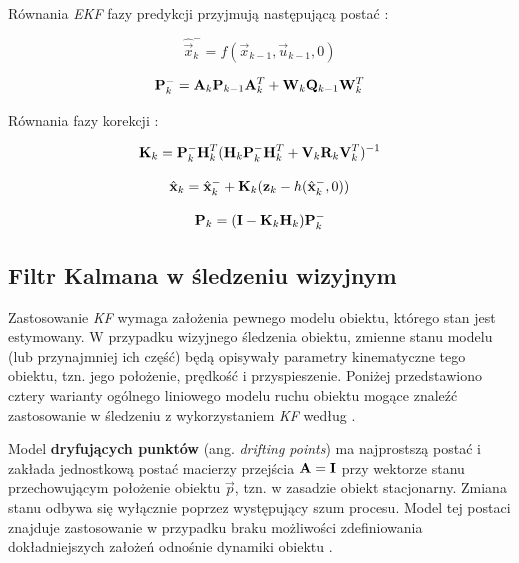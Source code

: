 Równania \textit{EKF} fazy predykcji przyjmują następującą postać \cite{Welch1995}:

\begin{equation}
\label{equ:Rozszerzony_Filtr_Kalmana_faza_predykcji_stan}
	\hat{\vec{x}}_k^- = f(\vec{x}_{k-1}, \vec{u}_{k-1}, 0)
\end{equation}

\begin{equation}
\label{equ:Rozszerzony_Filtr_Kalmana_faza_predykcji_macierz_kowariancji_bledow}
	\mathbf{P}_k^- = \mathbf{A}_k \mathbf{P}_{k-1} \mathbf{A}_k^T + \mathbf{W}_k\mathbf{Q}_{k-1}\mathbf{W}_k^T
\end{equation}

Równania fazy korekcji \cite{Welch1995}:

\begin{equation}
\label{equ:Rozszerzony_Filtr_Kalmana_faza_korekcji_wzmocnienie}
	\mathbf{K}_k = \mathbf{P}_k^- \mathbf{H}_k^T ( \mathbf{H}_k \mathbf{P}_k^- \mathbf{H}_k^T + \mathbf{V}_k\mathbf{R}_k\mathbf{V}_k^T ) ^ {-1}
\end{equation}

\begin{equation}
\label{equ:Rozszerzony_Filtr_Kalmana_faza_korekcji_stan}
	\hat{\mathbf{x}}_k = \hat{\mathbf{x}}_k^- + \mathbf{K}_k(\mathbf{z}_k - h(\hat{\mathbf{x}}_k^-,0))
\end{equation}

\begin{equation}
\label{equ:Rozszerzony_Filtr_Kalmana_faza_korekcji_macierz_kowariancji_bledow}
	\mathbf{P}_k = (\mathbf{I} - \mathbf{K}_k \mathbf{H}_k) \mathbf{P}_k^-
\end{equation}

\subsection{Filtr Kalmana w śledzeniu wizyjnym}
\label{subsec:Filtr_Kalmana_w_sledzeniu_wizyjnym}

Zastosowanie \textit{KF} wymaga założenia pewnego modelu obiektu, którego stan jest estymowany. W przypadku wizyjnego śledzenia obiektu, zmienne stanu modelu (lub przynajmniej ich część) będą opisywały parametry kinematyczne tego obiektu, tzn. jego położenie, prędkość i przyspieszenie. Poniżej przedstawiono cztery warianty ogólnego liniowego modelu ruchu obiektu mogące znaleźć zastosowanie w śledzeniu z wykorzystaniem \textit{KF} według \cite{Forsyth2012}.

Model \textbf{dryfujących punktów} (ang. \textit{drifting points}) ma najprostszą postać i zakłada jednostkową postać macierzy przejścia $\mathbf{A} = \mathbf{I}$ przy wektorze stanu przechowującym położenie obiektu $\vec{p}$, tzn. w zasadzie obiekt stacjonarny. Zmiana stanu odbywa się wyłącznie poprzez występujący szum procesu. Model tej postaci znajduje zastosowanie w przypadku braku możliwości zdefiniowania dokładniejszych założeń odnośnie dynamiki obiektu \cite{Forsyth2012}.

